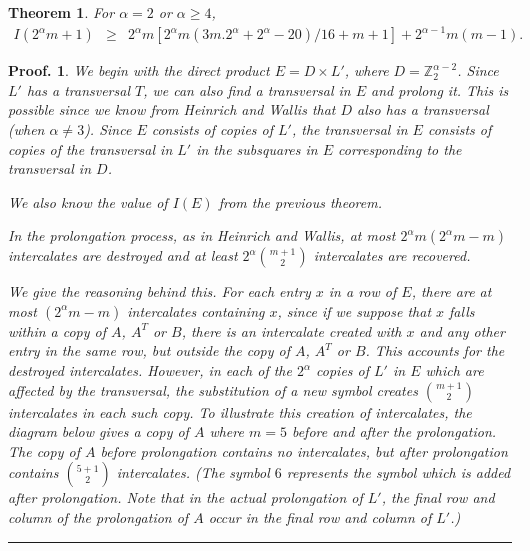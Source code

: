\documentclass[12pt]{report}
\newtheorem{theorem}{Theorem}
\newtheorem{preproof}{{\bf Proof.}}
\newenvironment{proof}[1]{\begin{preproof}{\rm
               #1}\hfill{\rule[-0.5mm]{2mm}{2mm}}}{\end{preproof}}
\begin{document}
\begin{theorem}
For $\alpha = 2$ or $\alpha \geq 4$, 
\begin{eqnarray*}
I(2^\alpha m+ 1) &\geq& 2^\alpha m [ 2^\alpha m(3m.2^\alpha + 2^\alpha - 20)/16 + m + 1] + 2^{\alpha-1} m (m-1).
\end{eqnarray*} 
\end{theorem}

\begin{proof}
{
We begin with the direct product $E = D \times L'$, where $D =
{\mathbb Z}_2^{\alpha-2}$.  Since $L'$ has a transversal $T$, we can also find
a transversal in $E$ and prolong it.  This is possible since we know
from Heinrich and Wallis \cite{MR84g:05034} that $D$ also has a transversal (when $\alpha
\neq 3$).  Since $E$ consists of copies of $L'$, the
transversal in $E$ consists of copies of the transversal in $L'$
in the subsquares in $E$ corresponding to the transversal in $D$.

We also know the value of $I(E)$ from the previous theorem.

In the prolongation process, as in Heinrich and Wallis, 
at most $2^\alpha m (2^\alpha m - m)$ intercalates are destroyed
and at least $2^\alpha {m+1 \choose 2}$ intercalates
are recovered.  

We give the reasoning behind this.  For each entry $x$ in a row of
$E$, there are at most $(2^\alpha m - m)$ intercalates containing $x$,
since if we suppose that $x$ falls within a copy of $A$, $A^T$ or $B$, there is
an intercalate created with $x$ and any other entry in the same
row, but outside the copy of $A$, $A^T$ or $B$.  This accounts for the destroyed
intercalates.  However, in each of the $2^\alpha$ copies of $L'$ in $E$
which are affected by the transversal, the substitution of a new symbol
creates ${m+1 \choose 2}$ intercalates in each such copy.  To illustrate
this creation of intercalates, the diagram below gives a copy of $A$
where $m=5$ before and after the prolongation.  The copy of $A$ before
prolongation contains no intercalates, but after prolongation contains
${5+1 \choose 2}$ intercalates.  (The symbol $6$ represents the symbol
which is added after prolongation.  Note that in the actual prolongation of 
$L'$, the final row and column
of the prolongation of $A$ occur in the final row and column of $L'$.)

}
\end{proof}
\end{document}
